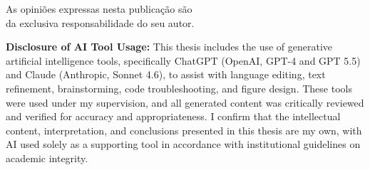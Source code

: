 \documentclass[12pt, twoside]{report}
\begin{document}
\begin{titlepage}
    \begin{center}
        \vspace*{\fill}
        As opiniões expressas nesta publicação são\\
        da exclusiva responsabilidade do seu autor. \\
        
        \vspace*{2cm}
        
    \end{center}
\end{titlepage}


\tableofcontents






\cleardoublepage

\cleardoublepage


\listoffigures
{}

\listoftables
{}

\listofmyequations
{}

\printglossary
\renewcommand*{\acronymname}{Abbreviations, acronyms, innitialisms, and symbols}
\printnoidxglossary[type=\acronymtype, nonumberlist=true] 
\printacronyms

 \pagebreak
\vspace*{\fill}
\begin{center}
	
	\textbf{ Disclosure of AI Tool Usage:} This thesis includes the use of generative artificial intelligence tools, specifically ChatGPT (OpenAI, GPT-4 and GPT 5.5) and Claude (Anthropic, Sonnet 4.6), to assist with language editing, text refinement, brainstorming, code troubleshooting, and figure design. These tools were used under my supervision, and all generated content was critically reviewed and verified for accuracy and appropriateness. I confirm that the intellectual content, interpretation, and conclusions presented in this thesis are my own, with AI used solely as a supporting tool in accordance with institutional guidelines on academic integrity.
\end{center}

\end{document}
